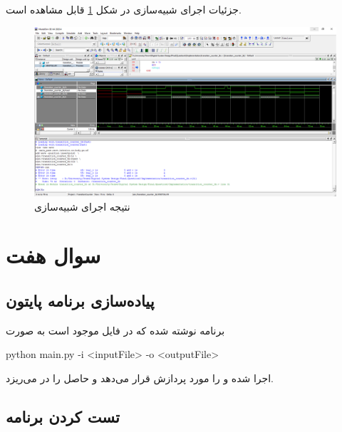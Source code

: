 \documentclass[fleqn]{article}
\begin{document}
جزئیات اجرای شبیه‌سازی در شکل 
\ref{simulate6} 
قابل مشاهده است. 

\begin{figure}
	\centering
	\includegraphics[width=\linewidth]{6.png}
	\caption{نتیجه اجرای شبیه‌سازی }
	\label{simulate6}
\end{figure}

\section{سوال هفت}
\subsection{پیاده‌سازی برنامه پایتون}
برنامه نوشته شده که در فایل 
موجود است به صورت 
\begin{latin}
	python main.py -i <inputFile> -o <outputFile>
\end{latin}
اجرا شده و 
را مورد پردازش قرار می‌دهد و حاصل را در 
می‌ریزد.

\subsection{تست کردن برنامه}
\end{document}
